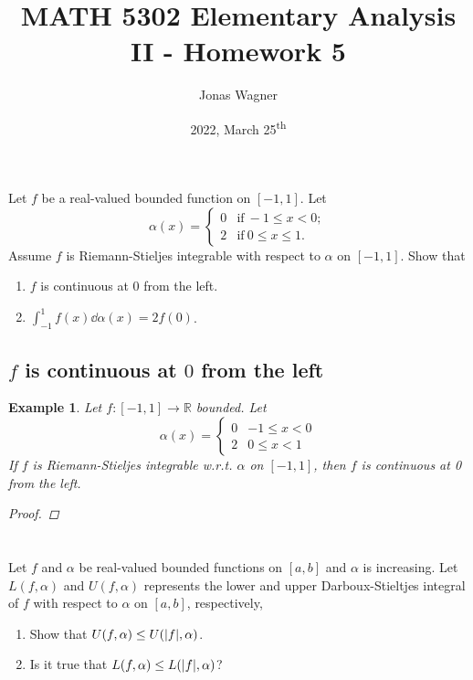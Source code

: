 \documentclass[]{article}
\title{MATH 5302 Elementary Analysis II - Homework 5}
\author{Jonas Wagner}
\date{2022, March 25\textsuperscript{th}}
\newcommand{\R}{\mathbb{R}}
\newtheorem{example}{Example}
\begin{document}
\maketitle

\section{}
Let $f$ be a real-valued bounded function on $[-1,1]$. 
Let\[
    \alpha(x) = \begin{cases}
        0 &\text{if} \ -1 \leq x < 0;\\
        2 &\text{if} \  0 \leq x \leq 1.
    \end{cases}
\]
Assume $f$ is Riemann-Stieljes integrable with respect to $\alpha$ on $[-1,1]$. 
Show that \begin{enumerate}
    \item $f$ is continuous at $0$ from the left.
    \item $\int_{-1}^{1} f(x) \dd{\alpha(x)} = 2 f(0)$.
\end{enumerate}

\subsection{$f$ is continuous at $0$ from the left}
\begin{example}
    Let $f : [-1, 1] \to \R$ bounded.
    Let \[
        \alpha(x) = \begin{cases}
            0   & -1 \leq x < 0\\
            2   &  0 \leq x < 1
        \end{cases}
    \] If $f$ is Riemann-Stieljes integrable w.r.t. $\alpha$ on $[-1,1]$, then $f$ is continuous at 0 from the left.
    \begin{proof}

    \end{proof}
\end{example}












\newpage
\section{}
Let $f$ and $\alpha$ be real-valued bounded functions on $[a,b]$ and $\alpha$ is increasing. 
Let $L(f,\alpha)$ and $U(f,\alpha)$ represents the lower and upper Darboux-Stieltjes integral of $f$ with respect to $\alpha$ on $[a,b]$, respectively,\begin{enumerate}
    \item Show that $U(f,\alpha) \leq U(\abs{f},\alpha)$.
    \item Is it true that $L(f,\alpha) \leq L(\abs{f},\alpha)$?
\end{enumerate}
\end{document}
